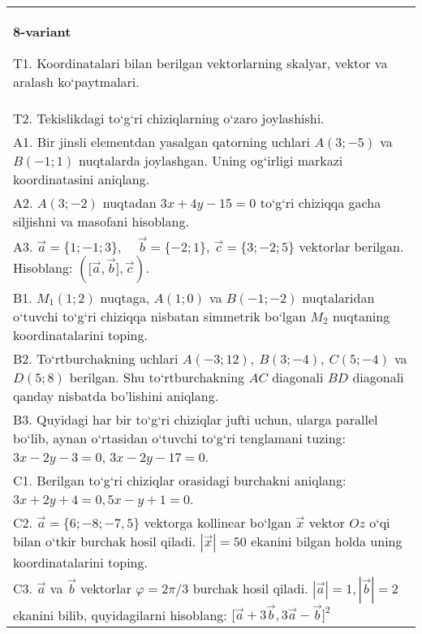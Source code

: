 \documentclass{article}
\begin{document}
\begin{tabular}{m{17cm}}
\textbf{8-variant}

T1. 
Koordinatalari bilan berilgan vektorlarning skalyar, vektor va aralash ko‘paytmalari.
 \\
T2. 
Tekislikdagi to‘g‘ri chiziqlarning o‘zaro joylashishi.
 \\
A1. 
Bir jinsli elementdan yasalgan qatorning uchlari
$A (3;-5) $ va $B (-1;1) $ nuqtalarda joylashgan. Uning og‘irligi
markazi koordinatasini aniqlang.
 \\
A2. 
$A (3;-2) $ nuqtadan $3x+4y-15=0$ to‘g‘ri chiziqqa
gacha siljishni va masofani hisoblang.
 \\
A3. 
$\overrightarrow{a}
= \{ 1; - 1;3\}, \ \ \ \ \ \overrightarrow{b} = \{ - 2;1\}$, $\overrightarrow{c} = \{3; -2;5\}$ vektorlar berilgan. Hisoblang:
$ (\lbrack\overrightarrow{a},\overrightarrow{b}\rbrack,\overrightarrow{c}) $.
 \\
B1. 
\(M_{1} (1;2) \) nuqtaga, \(A (1;0) \) va \(B (-1;-2) \)
nuqtalaridan o‘tuvchi to‘g‘ri chiziqqa nisbatan simmetrik bo‘lgan \(M_{2}\) nuqtaning koordinatalarini toping.
 \\
B2. 
To‘rtburchakning uchlari
\(A (-3;12),\ B (3;-4),\ C (5;-4) \) va \(D (5;8) \) berilgan. Shu
to‘rtburchakning $AC$ diagonali $BD$ diagonali qanday
nisbatda bo'lishini aniqlang.
 \\
B3. 
Quyidagi har bir to‘g‘ri chiziqlar jufti uchun, ularga parallel
bo‘lib, aynan o‘rtasidan o‘tuvchi to‘g‘ri tenglamani tuzing: $3x-2y-3=0$, $3x-2y-17=0$.
 \\
C1. 
Berilgan to‘g‘ri chiziqlar orasidagi burchakni aniqlang: $3x+2y+4=0, 5x-y+1=0$.
 \\
C2. 
$\vec{a} = \{ 6; - 8; - 7,5\}$ vektorga kollinear bo‘lgan $\vec{x}$ vektor $Oz$ o‘qi bilan o‘tkir burchak hosil qiladi. $|\vec{x}| = 50$ ekanini bilgan holda uning koordinatalarini toping.
 \\
C3. 
$\vec{a}$ va $\vec{b}$ vektorlar $\varphi = 2\pi/3$ burchak hosil qiladi. $|\vec{a}| = 1,|\vec{b}| = 2$ ekanini bilib, quyidagilarni hisoblang:
$\lbrack\overrightarrow{a} + 3\overrightarrow{b},3\overrightarrow{a} - \overrightarrow{b}\rbrack^{2}$
 \\

\end{tabular}
\vspace{1cm}
\end{document}
